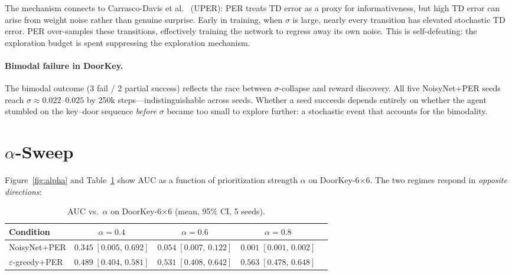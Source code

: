 \documentclass{article}
\begin{document}
The mechanism connects to Carrasco-Davis et al.~\cite{carrasco2025uper}
(UPER): PER treats TD error as a proxy for informativeness, but high
TD error can arise from weight noise rather than genuine surprise.
Early in training, when $\sigma$ is large, nearly every transition has
elevated stochastic TD error.
PER over-samples these transitions, effectively training the network to
regress away its own noise.
This is self-defeating: the exploration budget is spent suppressing the
exploration mechanism.

\paragraph{Bimodal failure in DoorKey.}
The bimodal outcome (3 fail / 2 partial success) reflects the race between
$\sigma$-collapse and reward discovery.
All five NoisyNet$+$PER seeds reach $\sigma \approx 0.022$--$0.025$ by
250k steps---indistinguishable across seeds.
Whether a seed succeeds depends entirely on whether the agent stumbled on
the key--door sequence \emph{before} $\sigma$ became too small to explore
further: a stochastic event that accounts for the bimodality.

\section{$\alpha$-Sweep}
\label{sec:alpha}

Figure~\ref{fig:alpha} and Table~\ref{tab:alpha} show AUC as a function of
prioritization strength $\alpha$ on DoorKey-6$\times$6.
The two regimes respond in \emph{opposite directions}:

\begin{table}[h]
\centering
\caption{AUC vs.\ $\alpha$ on DoorKey-6$\times$6 (mean, 95\% CI, 5 seeds).}
\label{tab:alpha}
\small
\begin{tabular}{lcccc}
\toprule
\textbf{Condition} & $\alpha=0.4$ & $\alpha=0.6$ & $\alpha=0.8$ \\
\midrule
NoisyNet$+$PER   & $0.345\;[0.005,\,0.692]$ & $0.054\;[0.007,\,0.122]$ & $0.001\;[0.001,\,0.002]$ \\
$\varepsilon$-greedy$+$PER & $0.489\;[0.404,\,0.581]$ & $0.531\;[0.408,\,0.642]$ & $0.563\;[0.478,\,0.648]$ \\
\bottomrule
\end{tabular}
\end{table}
\end{document}
